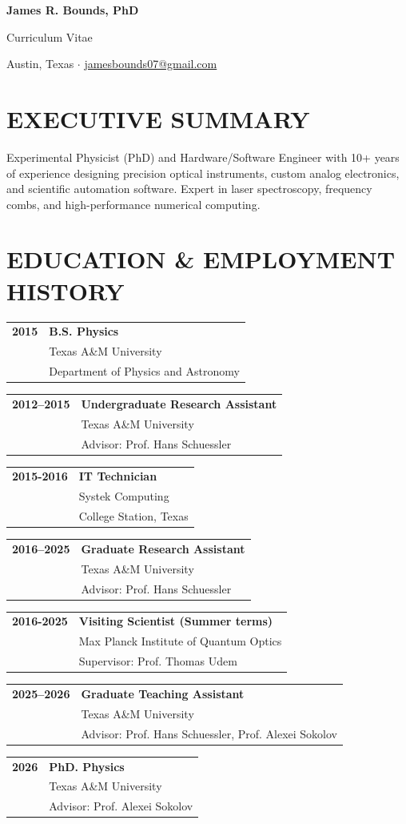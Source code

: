 \documentclass[a4paper,9pt]{extarticle}
\makeatletter
\newcommand{\ccventryy}[4]{
	\noindent
	\begin{tabular*}{\textwidth}{@{\extracolsep{\fill}}p{2.3cm}p{13cm}}
		\textbf{#1} &
		\textbf{#2}\\
		&
		#3\\
		&
		#4\\[0.8em]
	\end{tabular*}
}
\makeatother
\begin{document}
	
	\pagestyle{empty}
	
	\begin{center}
		{\LARGE\bfseries James R. Bounds, PhD}
		
		\vspace{3pt}
		
		Curriculum Vitae
		
		\vspace{4pt}
		
		Austin, Texas \quad$\cdot$\quad
		\href{mailto:jamesbounds07@gmail.com}{jamesbounds07@gmail.com} %
	\end{center}
	
	\section*{EXECUTIVE SUMMARY}
	Experimental Physicist (PhD) and Hardware/Software Engineer with 10+ years of experience designing precision optical instruments, custom analog electronics, and scientific automation software. Expert in laser spectroscopy, frequency combs, and high-performance numerical computing.
	
	\section*{EDUCATION \& EMPLOYMENT HISTORY}
	\ccventryy%
	{2015}
	{B.S. Physics}
	{Texas A\&M University}
	{Department of Physics and Astronomy}
	
	\ccventryy
	{2012--2015}
	{Undergraduate Research Assistant}
	{Texas A\&M University}
	{Advisor: Prof. Hans Schuessler}
	
	\ccventryy
	{2015-2016}
	{IT Technician}
	{Systek Computing}
	{College Station, Texas}
	
	\ccventryy
	{2016--2025}
	{Graduate Research Assistant}
	{Texas A\&M University}
	{Advisor: Prof. Hans Schuessler}
	
	\ccventryy
	{2016-2025}
	{Visiting Scientist (Summer terms)}
	{Max Planck Institute of Quantum Optics}
	{Supervisor: Prof. Thomas Udem}
	
	\ccventryy
	{2025--2026}
	{Graduate Teaching Assistant}
	{Texas A\&M University}
	{Advisor: Prof. Hans Schuessler, Prof. Alexei Sokolov}
	
	\ccventryy
	{2026}
	{PhD. Physics}
	{Texas A\&M University}
	{Advisor: Prof. Alexei Sokolov}
	
\end{document}
